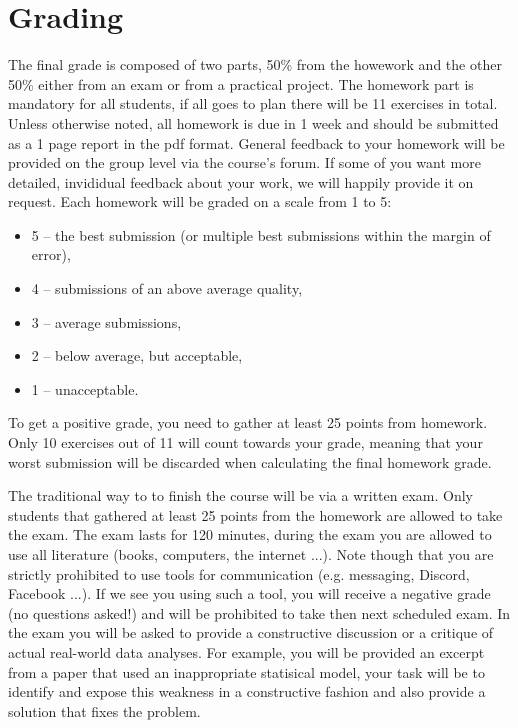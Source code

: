 \documentclass[fleqn,moreauthors,10pt]{ds_report}
\begin{document}
\flushbottom

\maketitle

\thispagestyle{empty} 



\section*{Grading}

The final grade is composed of two parts, 50\% from the howework and the other 50\% either from an exam or from a practical project. The homework part is mandatory for all students, if all goes to plan there will be 11 exercises in total. Unless otherwise noted, all homework is due in 1 week and should be submitted as a 1 page report in the pdf format. General feedback to your homework will be provided on the group level via the course's forum. If some of you want more detailed, invididual feedback about your work, we will happily provide it on request. Each homework will be graded on a scale from 1 to 5:

\begin{itemize}
	\item 5 -- the best submission (or multiple best submissions within the margin of error),
	\item 4 -- submissions of an above average quality,
	\item 3 -- average submissions,
	\item 2 -- below average, but acceptable,
	\item 1 -- unacceptable.
\end{itemize}

To get a positive grade, you need to gather at least 25 points from homework. Only 10 exercises out of 11 will count towards your grade, meaning that your worst submission will be discarded when calculating the final homework grade.

The traditional way to to finish the course will be via a written exam. Only students that gathered at least 25 points from the homework are allowed to take the exam. The exam lasts for 120 minutes, during the exam you are allowed to use all literature (books, computers, the internet ...). Note though that you are strictly prohibited to use tools for communication (e.g. messaging, Discord, Facebook ...). If we see you using such a tool, you will receive a negative grade (no questions asked!) and will be prohibited to take then next scheduled exam. In the exam you will be asked to provide a constructive discussion or a critique of actual real-world data analyses. For example, you will be provided an excerpt from a paper that used an inappropriate statisical model, your task will be to identify and expose this weakness in a constructive fashion and also provide a solution that fixes the problem.
\end{document}
